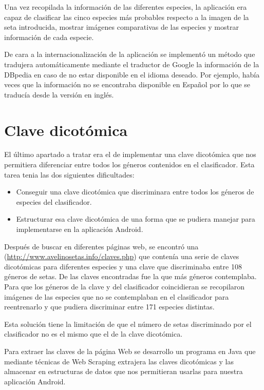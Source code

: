 Una vez recopilada la información de las diferentes especies, la aplicación era capaz de clasificar las cinco especies más probables respecto a la imagen de la seta introducida, mostrar imágenes comparativas de las especies y mostrar información de cada especie.

De cara a la internacionalización de la aplicación se implementó un método que tradujera automáticamente mediante el traductor de Google la información de la DBpedia en caso de no estar disponible en el idioma deseado. Por ejemplo, había veces que la información no se encontraba disponible en Español por lo que se traducía desde la versión en inglés.

\section{Clave dicotómica}

El último apartado a tratar era el de implementar una clave dicotómica que nos permitiera diferenciar entre todos los géneros contenidos en el clasificador. Esta tarea tenia las dos siguientes dificultades:

\begin{itemize}
	\item Conseguir una clave dicotómica que discriminara entre todos los géneros de especies del clasificador.
	\item Estructurar esa clave dicotómica de una forma que se pudiera manejar para implementarse en la aplicación Android.
\end{itemize}

Después de buscar en diferentes páginas web, se encontró una (\url{http://www.avelinosetas.info/claves.php}) que contenía una serie de claves dicotómicas para diferentes especies y una clave que discriminaba entre 108 géneros de setas. De las claves encontradas fue la que más géneros contemplaba. Para que los géneros de la clave y del clasificador coincidieran se recopilaron imágenes de las especies que no se contemplaban en el clasificador para reentrenarlo y que pudiera discriminar entre 171 especies distintas.

Esta solución tiene la limitación de que el número de setas discriminado por el clasificador no es el mismo que el de la clave dicotómica.

Para extraer las claves de la página Web se desarrollo un programa en Java que mediante técnicas de Web Scraping extrajera las claves dicotómicas y las almacenar en estructuras de datos que nos permitieran usarlas para nuestra aplicación Android.

